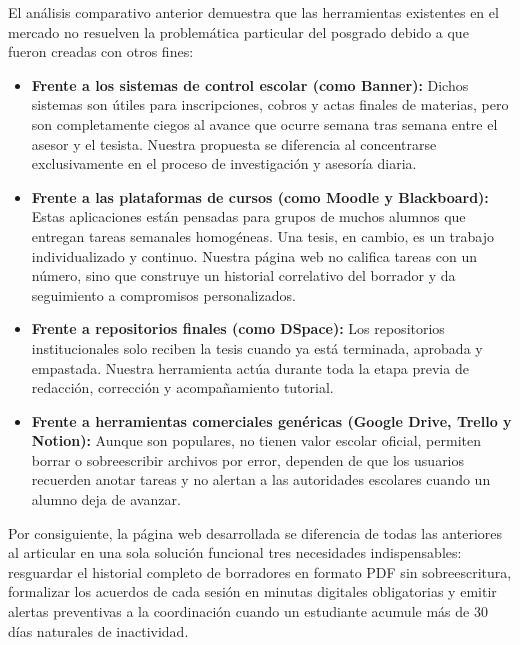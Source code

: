 El análisis comparativo anterior demuestra que las herramientas existentes en el mercado no resuelven la problemática particular del posgrado debido a que fueron creadas con otros fines:
\begin{itemize}
    \item \textbf{Frente a los sistemas de control escolar (como Banner):} Dichos sistemas son útiles para inscripciones, cobros y actas finales de materias, pero son completamente ciegos al avance que ocurre semana tras semana entre el asesor y el tesista. Nuestra propuesta se diferencia al concentrarse exclusivamente en el proceso de investigación y asesoría diaria.
    \item \textbf{Frente a las plataformas de cursos (como Moodle y Blackboard):} Estas aplicaciones están pensadas para grupos de muchos alumnos que entregan tareas semanales homogéneas. Una tesis, en cambio, es un trabajo individualizado y continuo. Nuestra página web no califica tareas con un número, sino que construye un historial correlativo del borrador y da seguimiento a compromisos personalizados.
    \item \textbf{Frente a repositorios finales (como DSpace):} Los repositorios institucionales solo reciben la tesis cuando ya está terminada, aprobada y empastada. Nuestra herramienta actúa durante toda la etapa previa de redacción, corrección y acompañamiento tutorial.
    \item \textbf{Frente a herramientas comerciales genéricas (Google Drive, Trello y Notion):} Aunque son populares, no tienen valor escolar oficial, permiten borrar o sobreescribir archivos por error, dependen de que los usuarios recuerden anotar tareas y no alertan a las autoridades escolares cuando un alumno deja de avanzar.
\end{itemize}

Por consiguiente, la página web desarrollada se diferencia de todas las anteriores al articular en una sola solución funcional tres necesidades indispensables: resguardar el historial completo de borradores en formato PDF sin sobreescritura, formalizar los acuerdos de cada sesión en minutas digitales obligatorias y emitir alertas preventivas a la coordinación cuando un estudiante acumule más de 30 días naturales de inactividad.